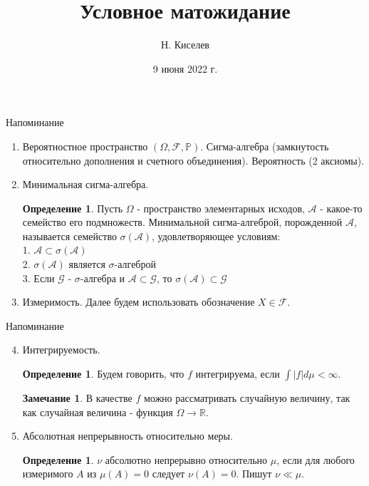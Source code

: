 \documentclass{beamer}%
\title{Условное матожидание}
\author[Н. Киселев]{Н. Киселев}
\institute[Клуб теории вероятностей]{Клуб теории вероятностей ФЭН ВШЭ}
\date{9 июня 2022 г.}
\theoremstyle{definition}
\newtheorem{mydef}[theorem]{Определение}
\newtheorem{remark}[theorem]{Замечание}
\newcommand{\R}{\mathbb{R}}
\renewcommand{\P}{\mathbb{P}}
\newcommand{\F}{\mathcal{F}}
\begin{document}
	
\begin{frame}
\titlepage
\end{frame}


\begin{frame}{Напоминание}

\begin{enumerate}
\item Вероятностное пространство $(\Omega, \F, \P)$. Сигма-алгебра (замкнутость относительно дополнения и счетного объединения). Вероятность (2 аксиомы).
\item Минимальная сигма-алгебра.
    \begin{mydef}
    Пусть $\Omega$ - пространство элементарных исходов, $\mathcal{A}$ - какое-то семейство его подмножеств. Минимальной сигма-алгеброй, порожденной $\mathcal{A}$, называется семейство $\sigma(\mathcal{A})$, удовлетворяющее условиям:
    \\
    1. $\mathcal{A}\subset\sigma(\mathcal{A})$
    \\
    2. $\sigma(\mathcal{A})$ является $\sigma$-алгеброй
    \\
    3. Если $\mathcal{G}$ - $\sigma$-алгебра и $\mathcal{A}\subset\mathcal{G}$, то $\sigma(\mathcal{A})\subset\mathcal{G}$
    \end{mydef}
\item Измеримость. Далее будем использовать обозначение $X\in\F$.
\end{enumerate}

\end{frame}


\begin{frame}{Напоминание}

\begin{enumerate}
\setcounter{enumi}{3}
\item Интегрируемость.
    \begin{mydef}
    Будем говорить, что $f$ интегрируема, если $\int |f|d\mu<\infty$.
    \end{mydef}
    \begin{remark}
    В качестве $f$ можно рассматривать случайную величину, так как случайная величина - функция $\Omega\to\R$.
    \end{remark}
\item Абсолютная непрерывность относительно меры.
    \begin{mydef}
    $\nu$ абсолютно непрерывно относительно $\mu$, если для любого измеримого $A$ из $\mu(A)=0$ следует $\nu(A)=0$. Пишут $\nu\ll\mu$.
    \end{mydef}
\end{enumerate}

\end{frame}
\end{document}
